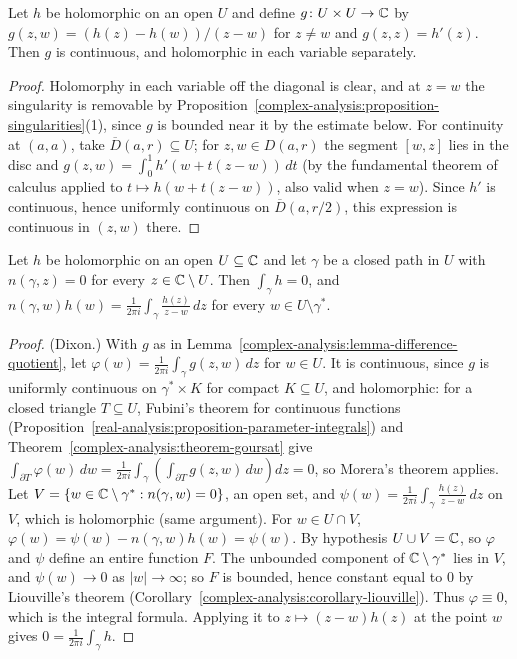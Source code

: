 \begin{lemma}\label{complex-analysis:lemma-difference-quotient}
Let $h$ be holomorphic on an open $U$ and define $g \colon U \times U \to \mathbb{C}$ by $g(z, w) = (h(z) - h(w))/(z - w)$ for $z \neq w$ and $g(z, z) = h'(z)$. Then $g$ is continuous, and holomorphic in each
variable separately.
\end{lemma}

\begin{proof}
Holomorphy in each variable off the diagonal is clear, and at $z = w$ the singularity is removable by Proposition~\ref{complex-analysis:proposition-singularities}(1), since $g$ is bounded near it by the
estimate below. For continuity at $(a, a)$, take $\overline{D}(a, r) \subseteq U$; for $z, w \in D(a, r)$ the segment $[w, z]$ lies in the disc and
$g(z, w) = \int_0^1h'(w + t(z - w))\,dt$ (by the fundamental theorem of calculus applied to $t \mapsto h(w + t(z - w))$, also valid when $z = w$). Since $h'$ is continuous, hence uniformly continuous on
$\overline{D}(a, r/2)$, this expression is continuous in $(z, w)$ there.
\end{proof}

\begin{theorem}\label{complex-analysis:theorem-cauchy-homology}
Let $h$ be holomorphic on an open $U \subseteq \mathbb{C}$ and let $\gamma$ be a closed path in $U$ with $n(\gamma, z) = 0$ for every $z \in \mathbb{C} \setminus U$. Then $\int_\gamma h = 0$, and
$n(\gamma, w)h(w) = \frac{1}{2\pi i}\int_\gamma\frac{h(z)}{z - w}\,dz$ for every $w \in U \setminus \gamma^*$.
\end{theorem}

\begin{proof}
(Dixon.) With $g$ as in Lemma~\ref{complex-analysis:lemma-difference-quotient}, let $\varphi(w) = \frac{1}{2\pi i}\int_\gamma g(z, w)\,dz$ for $w \in U$. It is continuous, since $g$ is uniformly continuous on
$\gamma^* \times K$ for compact $K \subseteq U$, and holomorphic: for a closed triangle $T \subseteq U$, Fubini's theorem for continuous functions
(Proposition~\ref{real-analysis:proposition-parameter-integrals}) and Theorem~\ref{complex-analysis:theorem-goursat} give
$\int_{\partial T}\varphi(w)\,dw = \frac{1}{2\pi i}\int_\gamma\left(\int_{\partial T}g(z, w)\,dw\right)dz = 0$, so Morera's theorem applies. Let $V = \{w \in \mathbb{C} \setminus \gamma^* : n(\gamma, w) = 0\}$, an open set,
and $\psi(w) = \frac{1}{2\pi i}\int_\gamma\frac{h(z)}{z - w}\,dz$ on $V$, which is holomorphic (same argument). For $w \in U \cap V$,
$\varphi(w) = \psi(w) - n(\gamma, w)h(w) = \psi(w)$. By hypothesis $U \cup V = \mathbb{C}$, so $\varphi$ and $\psi$ define an entire function $F$. The unbounded component of $\mathbb{C} \setminus \gamma^*$ lies in $V$, and
$\psi(w) \to 0$ as $|w| \to \infty$; so $F$ is bounded, hence constant equal to $0$ by Liouville's theorem (Corollary~\ref{complex-analysis:corollary-liouville}). Thus $\varphi \equiv 0$, which is the integral
formula. Applying it to $z \mapsto (z - w)h(z)$ at the point $w$ gives $0 = \frac{1}{2\pi i}\int_\gamma h$.
\end{proof}

